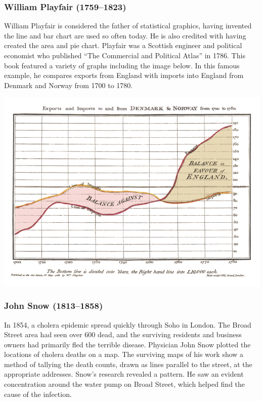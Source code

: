\documentclass[]{book}
\begin{document}
\hypertarget{william-playfair-17591823}{%
\subsubsection{William Playfair (1759--1823)}\label{william-playfair-17591823}}

William Playfair is considered the father of statistical graphics, having invented the line and bar chart are used so often today. He is also credited with having created the area and pie chart. Playfair was a Scottish engineer and political economist who published ``The Commercial and Political Atlas'' in 1786. This book featured a variety of graphs including the image below. In this famous example, he compares exports from England with imports into England from Denmark and Norway from 1700 to 1780.

\includegraphics{images/Playfair.png}

\hypertarget{john-snow-18131858}{%
\subsubsection{John Snow (1813--1858)}\label{john-snow-18131858}}

In 1854, a cholera epidemic spread quickly through Soho in London. The Broad Street area had seen over 600 dead, and the surviving residents and business owners had primarily fled the terrible disease. Physician John Snow plotted the locations of cholera deaths on a map. The surviving maps of his work show a method of tallying the death counts, drawn as lines parallel to the street, at the appropriate addresses. Snow's research revealed a pattern. He saw an evident concentration around the water pump on Broad Street, which helped find the cause of the infection.
\end{document}
